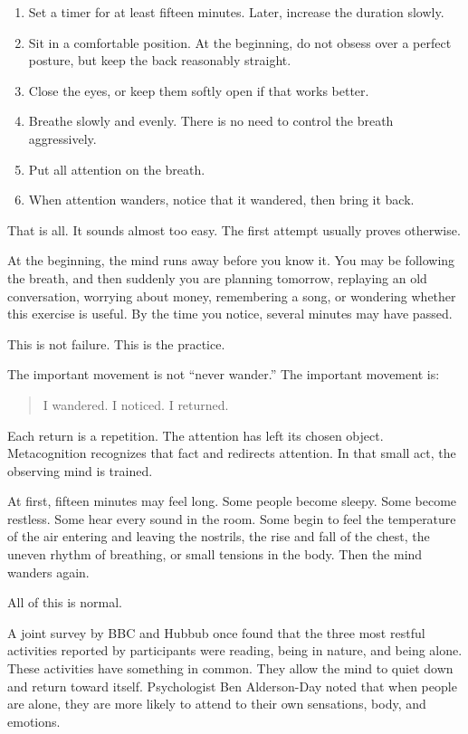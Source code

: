 \begin{enumerate}
\item Set a timer for at least fifteen minutes. Later, increase the duration slowly.
\item Sit in a comfortable position. At the beginning, do not obsess over a perfect posture, but keep the back reasonably straight.
\item Close the eyes, or keep them softly open if that works better.
\item Breathe slowly and evenly. There is no need to control the breath aggressively.
\item Put all attention on the breath.
\item When attention wanders, notice that it wandered, then bring it back.
\end{enumerate}

That is all. It sounds almost too easy. The first attempt usually proves otherwise.

At the beginning, the mind runs away before you know it. You may be following the breath, and then suddenly you are planning tomorrow, replaying an old conversation, worrying about money, remembering a song, or wondering whether this exercise is useful. By the time you notice, several minutes may have passed.

This is not failure. This is the practice.

The important movement is not ``never wander.'' The important movement is:

\begin{quote}
I wandered. I noticed. I returned.
\end{quote}

Each return is a repetition. The attention has left its chosen object. Metacognition recognizes that fact and redirects attention. In that small act, the observing mind is trained.

At first, fifteen minutes may feel long. Some people become sleepy. Some become restless. Some hear every sound in the room. Some begin to feel the temperature of the air entering and leaving the nostrils, the rise and fall of the chest, the uneven rhythm of breathing, or small tensions in the body. Then the mind wanders again.

All of this is normal.

A joint survey by BBC and Hubbub once found that the three most restful activities reported by participants were reading, being in nature, and being alone. These activities have something in common. They allow the mind to quiet down and return toward itself. Psychologist Ben Alderson-Day noted that when people are alone, they are more likely to attend to their own sensations, body, and emotions.

